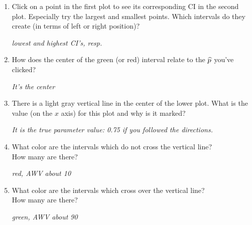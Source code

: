   \begin{enumerate}
      \item   Click on a point in the first plot to see its corresponding CI in
  the second plot.  Especially try the largest and smallest points.
  Which intervals do they create (in terms of left or right position)?
\begin{students}
  \vspace{1cm}
\end{students}
\begin{key}
  {\it lowest and highest CI's, resp.}
\end{key}
\item How does the center of the green (or red)  interval relate to the $\widehat{p}$
  you've clicked?  
\begin{students}
  \vspace{1cm}
\end{students}
\begin{key}
  {\it It's the center}
\end{key}
\item There is a light gray vertical line in the center of the lower
  plot. What is the value (on the $x$ axis) for this plot and why is
  it marked?
\begin{students}
  \vspace{1cm}
\end{students}
\begin{key}
  {\it It is the true parameter value: 0.75 if you followed the directions.}
\end{key}
\item What color are the intervals which do not cross the vertical
  line? \\How many are there?
\begin{students}
  \vspace{1cm}
\end{students}

\begin{key}
  {\it red, AWV about 10}
\end{key}

\item What color are the intervals which cross over the vertical
  line? \\How many are there?
\begin{students}
  \vspace{1cm}
\end{students}

\begin{key}
  {\it green, AWV about 90}
\end{key}


\end{enumerate}
